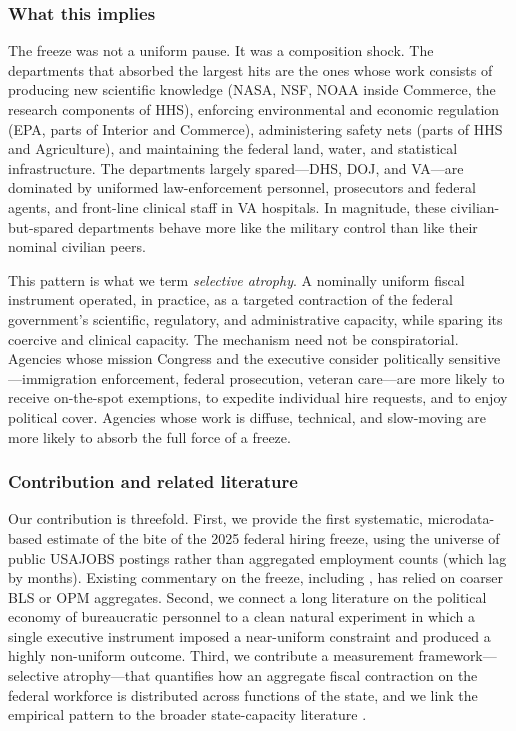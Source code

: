 \documentclass[12pt]{article}
\begin{document}
\subsubsection*{What this implies} The freeze was not a uniform pause. It was a composition shock. The departments that absorbed the largest hits are the ones whose work consists of producing new scientific knowledge (NASA, NSF, NOAA inside Commerce, the research components of HHS), enforcing environmental and economic regulation (EPA, parts of Interior and Commerce), administering safety nets (parts of HHS and Agriculture), and maintaining the federal land, water, and statistical infrastructure. The departments largely spared---DHS, DOJ, and VA---are dominated by uniformed law-enforcement personnel, prosecutors and federal agents, and front-line clinical staff in VA hospitals. In magnitude, these civilian-but-spared departments behave more like the military control than like their nominal civilian peers.

This pattern is what we term \emph{selective atrophy}. A nominally uniform fiscal instrument operated, in practice, as a targeted contraction of the federal government's scientific, regulatory, and administrative capacity, while sparing its coercive and clinical capacity. The mechanism need not be conspiratorial. Agencies whose mission Congress and the executive consider politically sensitive---immigration enforcement, federal prosecution, veteran care---are more likely to receive on-the-spot exemptions, to expedite individual hire requests, and to enjoy political cover. Agencies whose work is diffuse, technical, and slow-moving are more likely to absorb the full force of a freeze.

\subsubsection*{Contribution and related literature} Our contribution is threefold. First, we provide the first systematic, microdata-based estimate of the bite of the 2025 federal hiring freeze, using the universe of public USAJOBS postings rather than aggregated employment counts (which lag by months). Existing commentary on the freeze, including \citet{richmondfed2025doge}, has relied on coarser BLS or OPM aggregates. Second, we connect a long literature on the political economy of bureaucratic personnel \citep{wilson1989bureaucracy,carpenter2001forging,lewis2008politics,gailmard2007beyond,moynihan2018state} to a clean natural experiment in which a single executive instrument imposed a near-uniform constraint and produced a highly non-uniform outcome. Third, we contribute a measurement framework---selective atrophy---that quantifies how an aggregate fiscal contraction on the federal workforce is distributed across functions of the state, and we link the empirical pattern to the broader state-capacity literature \citep{besley2009origins,finan2017personnel,dal2013strengthening}.
\end{document}
